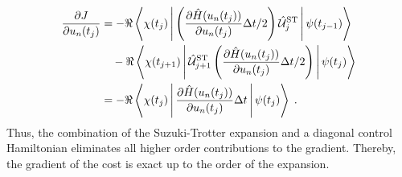 \begin{align}
	\frac{\partial J}{\partial u_n (t_j)} &= - \Re \Braket{\chi (t_j) |  \left(  \frac{\partial \hat{H} (u_n (t_j))}{\partial u_n (t_j)} \Delta t /2 \right) \hat{\mathcal{U}}_{j}^{\mathrm{ST}} | \psi (t_{j-1})} \nonumber \\
	& \quad - \Re \Braket{\chi (t_{j+1}) | \hat{\mathcal{U}}_{j+1}^{\mathrm{ST}} \left(  \frac{\partial \hat{H} (u_n (t_j))}{\partial u_n (t_j)} \Delta t /2 \right) | \psi (t_{j})} \nonumber \\
	&= - \Re \Braket{\chi (t_j) | \frac{\partial \hat{H} (u_n (t_j))}{\partial u_n (t_j)} \Delta t | \psi (t_{j})} \; . \label{eq:STcostgrad}
\end{align}  
Thus, the combination of the Suzuki-Trotter expansion and a diagonal control Hamiltonian eliminates all higher order contributions to the gradient. Thereby, the gradient of the cost is exact up to the order of the expansion.

